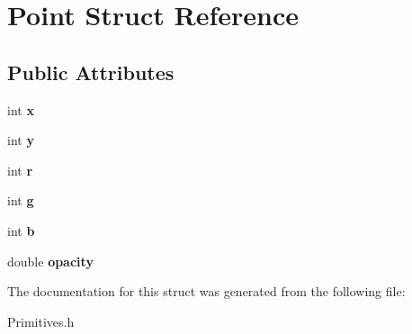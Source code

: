 \hypertarget{structPoint}{}\section{Point Struct Reference}
\label{structPoint}
\subsection*{Public Attributes}
\begin{DoxyCompactItemize}
\item 
\mbox{\label{structPoint_a8c779e11e694b20e0946105a9f5de842}} 
int {\bfseries x}
\item 
\mbox{\label{structPoint_a2e1b5fb2b2a83571f5c0bc0f66a73cf7}} 
int {\bfseries y}
\item 
\mbox{\label{structPoint_a5eec80a5eba17a6cfc509a17125a5f17}} 
int {\bfseries r}
\item 
\mbox{\label{structPoint_a9e9b4b8434c0d9ca60c34a98a57d341b}} 
int {\bfseries g}
\item 
\mbox{\label{structPoint_ade275c6d86d695a9b4d8f7affaef4719}} 
int {\bfseries b}
\item 
\mbox{\label{structPoint_a6c521917e69db0f084cc3ea925d54c1c}} 
double {\bfseries opacity}
\end{DoxyCompactItemize}


The documentation for this struct was generated from the following file\+:\begin{DoxyCompactItemize}
\item 
Primitives.\+h\end{DoxyCompactItemize}
